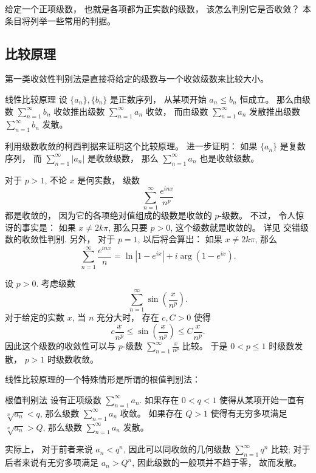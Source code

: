

给定一个正项级数， 也就是各项都为正实数的级数， 该怎么判别它是否收敛？ 本条目将列举一些常用的判据。

\subsection{比较原理}

第一类收敛性判别法是直接将给定的级数与一个收敛级数来比较大小。 

\begin{theorem}{线性比较原理}
设 $\{a_n\},\{b_n\}$ 是正数序列， 从某项开始 $a_n\leq b_n$ 恒成立。 那么由级数 $\sum_{n=1}^\infty b_n$ 收敛推出级数 $\sum_{n=1}^\infty a_n$ 收敛， 而由级数 $\sum_{n=1}^\infty a_n$ 发散推出级数 $\sum_{n=1}^\infty b_n$ 发散。
\end{theorem}
\begin{exercise}{}
利用级数收敛的柯西判据来证明这个比较原理。 进一步证明： 如果 $\{a_n\}$ 是复数序列， 而 $\sum_{n=1}^\infty|a_n|$ 是收敛级数， 那么 $\sum_{n=1}^\infty a_n$ 也是收敛级数。
\end{exercise}

\begin{example}{}
对于 $p>1$, 不论 $x$ 是何实数， 级数
$$
\sum_{n=1}^\infty\frac{e^{inx}}{n^p}
$$
都是收敛的， 因为它的各项绝对值组成的级数是收敛的 $p$-级数。 不过， 令人惊讶的事实是： 如果 $x\neq 2k\pi$, 那么只要 $p>0$, 这个级数就是收敛的。 详见 交错级数的收敛性判别. 另外， 对于 $p=1$, 以后将会算出： 如果 $x\neq 2k\pi$, 那么
$$
\sum_{n=1}^\infty\frac{e^{inx}}{n}=\ln|1-e^{ix}|+i\arg(1-e^{ix}).
$$
\end{example}

\begin{example}{}
设 $p>0$. 考虑级数
$$
\sum_{n=1}^\infty\sin\left(\frac{x}{n^p}\right).
$$
对于给定的实数 $x$, 当 $n$ 充分大时， 存在 $c,C>0$ 使得
$$
c\frac{x}{n^p}\leq\sin\left(\frac{x}{n^p}\right)\leq C\frac{x}{n^p}.
$$
因此这个级数的收敛性可以与 $p$-级数 $\sum_{n=1}^\infty\frac{x}{n^p}$ 比较。 于是 $0<p\leq1$ 时级数发散， $p>1$ 时级数收敛。
\end{example}

线性比较原理的一个特殊情形是所谓的根值判别法：

\begin{theorem}{根值判别法}
设有正项级数 $\sum_{n=1}^\infty a_n$. 如果存在 $0<q<1$ 使得从某项开始一直有 $\sqrt[n]{a_n}<q$, 那么级数 $\sum_{n=1}^\infty a_n$ 收敛。 如果存在 $Q>1$ 使得有无穷多项满足 $\sqrt[n]{a_n}>Q$, 那么级数 $\sum_{n=1}^\infty a_n$ 发散。
\end{theorem}
实际上， 对于前者来说 $a_n<q^n$, 因此可以同收敛的几何级数 $\sum_{n=1}^\infty q^n$ 比较; 对于后者来说有无穷多项满足 $a_n>Q^n$, 因此级数的一般项并不趋于零， 故而发散。

